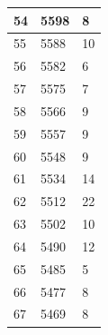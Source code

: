 \documentclass{article}
\begin{document}
\begin{center}
\begin{longtable}{|l|l|l|}
		\hline
		54                                                        & 5598                                                               & 8       \\ 
		\hline
		55                                                        & 5588                                                               & 10      \\ 
		\hline
		56                                                        & 5582                                                               & 6       \\ 
		\hline
		57                                                        & 5575                                                               & 7       \\ 
		\hline
		58                                                        & 5566                                                               & 9       \\ 
		\hline
		59                                                        & 5557                                                               & 9       \\ 
		\hline
		60                                                        & 5548                                                               & 9       \\ 
		\hline
		61                                                        & 5534                                                               & 14      \\ 
		\hline
		62                                                        & 5512                                                               & 22      \\ 
		\hline
		63                                                        & 5502                                                               & 10      \\ 
		\hline
		64                                                        & 5490                                                               & 12      \\ 
		\hline
		65                                                        & 5485                                                               & 5       \\ 
		\hline
		66                                                        & 5477                                                               & 8       \\ 
		\hline
		67                                                        & 5469                                                               & 8       \\ 

\end{longtable}
\end{center}
\end{document}
